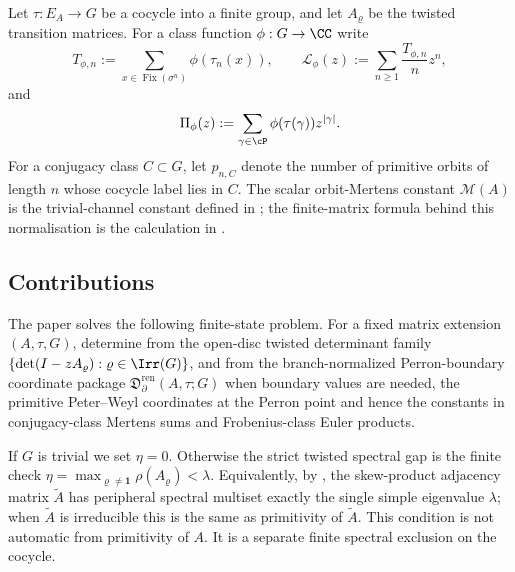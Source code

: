 Let \(\tau:E_A\to G\) be a cocycle into a finite group, and let
\(A_\varrho\) be the twisted transition matrices. For a class function
\(\phi:G\to\CC\) write
\[
  T_{\phi,n}:=\sum_{x\in\operatorname{Fix}(\sigma^n)}
    \phi(\tau_n(x)),
  \qquad
  \mathcal L_\phi(z):=\sum_{n\ge 1}\frac{T_{\phi,n}}{n}z^n,
\]
and
\[
  \Pi_\phi(z):=\sum_{\gamma\in\cP}\phi(\tau(\gamma))z^{|\gamma|}.
\]
For a conjugacy class \(C\subset G\), let \(p_{n,C}\) denote the number
of primitive orbits of length \(n\) whose cocycle label lies in \(C\).
The scalar orbit-Mertens constant \(\mathcal M(A)\) is the
trivial-channel constant defined in ; the
  finite-matrix formula behind this normalisation is the calculation in
  .

\subsection{Contributions}\label{sec:intro-scope-of-results}

The paper solves the following finite-state problem.  For a fixed matrix
extension \((A,\tau,G)\), determine from the open-disc twisted determinant
family
\(\{\det(I-zA_\varrho):\varrho\in\Irr(G)\}\), and from the
branch-normalized Perron-boundary coordinate package
\(\mathfrak D_\partial^{\mathrm{ren}}(A,\tau;G)\) when boundary values are
needed, the primitive Peter--Weyl coordinates at the Perron point and hence
the constants in conjugacy-class Mertens sums and Frobenius-class Euler
products.

\begin{remark}
  \label{rem:intro-operational-gap}
  If \(G\) is trivial we set \(\eta=0\).  Otherwise the strict twisted
  spectral gap is the finite check
  \(
    \eta=\max_{\varrho\ne\mathbf1}\rho(A_\varrho)<\lambda
  \).
  Equivalently, by , the
  skew-product adjacency matrix \(\widetilde A\) has peripheral spectral
  multiset exactly the single simple eigenvalue \(\lambda\); when
  \(\widetilde A\) is irreducible this is the same as primitivity of
  \(\widetilde A\).  This condition is not automatic from primitivity of
  \(A\).  It is a separate finite spectral exclusion on the cocycle.
\end{remark}

